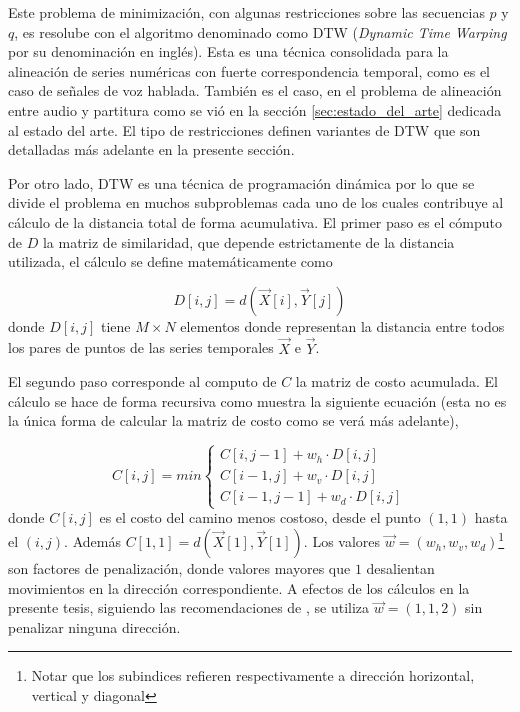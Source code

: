 \documentclass
  [ams,pdfout]%
	{aeslac}
\begin{document}
Este problema de minimización, con algunas restricciones sobre las secuencias $p$ y $q$, es resolube con el algoritmo denominado como DTW (\textit{Dynamic Time Warping} por su denominación en inglés). Esta es una técnica consolidada para la alineación de series numéricas con fuerte correspondencia temporal, como es el caso de señales de voz hablada\cite{rabiner1978considerations,sakoe1978dynamic}. También es el caso, en el problema de alineación entre audio y partitura como se vió en la sección \ref{sec:estado_del_arte} dedicada al estado del arte. El tipo de restricciones definen variantes de DTW que son detalladas más adelante en la presente sección.

Por otro lado, DTW es una técnica de programación dinámica por lo que se divide el problema en muchos subproblemas cada uno de los cuales contribuye al cálculo de la distancia total de forma acumulativa. El primer paso es el cómputo de $D$ la matriz de similaridad, que depende estrictamente de la distancia utilizada, el cálculo se define matemáticamente como


\begin{equation}
\label{eq:matrizsimilaridad}
D[i,j] = d(\vec{X}[i],\vec{Y}[j])
\end{equation}
donde $D[i,j]$ tiene $M\times N$ elementos donde representan la distancia entre todos los pares de puntos de las series temporales $\vec{X}$ e $\vec{Y}$.  


El segundo paso corresponde al computo de $C$ la matriz de costo acumulada. El cálculo se hace de forma recursiva como muestra la siguiente ecuación (esta no es la única forma de calcular la matriz de costo como se verá más adelante), 

\begin{equation}
\label{eq:matrizcosto}
C[i,j] = min\left\lbrace  
\begin{array}{ll}
C[i,j-1] + w_h\cdot D[i,j]\\
C[i-1,j] + w_v\cdot D[i,j]\\
C[i-1,j-1] + w_d\cdot D[i,j]
\end{array}
\right.
\end{equation}
donde $C[i,j]$ es el costo del camino menos costoso, desde el punto $(1,1)$ hasta el $(i,j)$. Además $C[1,1]=d(\vec{X}[1],\vec{Y}[1])$. Los valores $\vec{w}=(w_h,w_v,w_d)$\footnote{Notar que los subindices refieren respectivamente a dirección horizontal, vertical y diagonal} son factores de penalización, donde valores mayores que $1$ desalientan movimientos en la dirección correspondiente. A efectos de los cálculos en la presente tesis, siguiendo las recomendaciones de \cite{sakoe1978dynamic}, se utiliza $\vec{w}=(1,1,2)$ sin penalizar ninguna dirección. 
\end{document}
